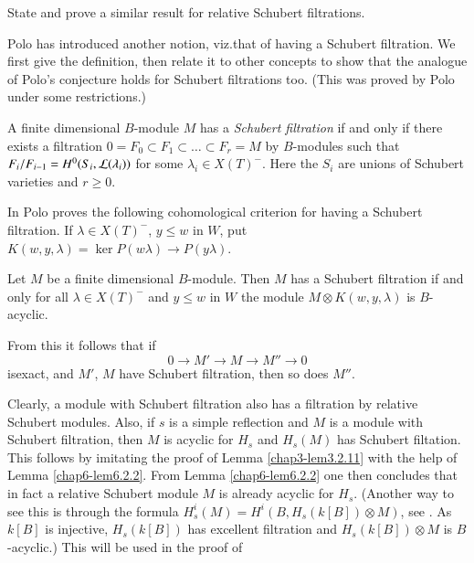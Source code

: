 \begin{exercise}\label{chap6-exer6.3.3}
State and prove a similar result for relative Schubert filtrations.
\end{exercise}

Polo has introduced another notion, viz.\@ that of having a Schubert
filtration. We first give the definition, then relate it to other
concepts to show that the analogue of Polo's conjecture holds for
Schubert filtrations too. (This was proved by Polo under some
restrictions.) 

\begin{definition}\label{chap6-defi6.3.4}
A finite dimensional $B$-module $M$ has a {\em Schubert filtration} if
and only if there exists a filtration $0=F_{0}\subset F_{1}\subset
\ldots \subset F_{r}=M$ by $B$-modules such that
$F_{i}/F_{i-1}=H^{0}(S_{i},\mathcal{L}(\lambda_{i}))$ for some $\lambda_{i}\in
X(T)^{-}$. Here the $S_{i}$ are unions of Schubert varieties and
$r\geq 0$.
\end{definition}

In \cite{key27} Polo proves the following cohomological criterion for
having a Schubert filtration. If $\lambda\in X(T)^{-}$, $y\leq w$ in
$W$, put $K(w,y,\lambda)=\ker P(w\lambda)\to P(y\lambda)$. 

\begin{theorem}[Polo]\label{chap6-thm6.3.5}
Let $M$ be a finite dimensional $B$-module. Then $M$ has a Schubert
filtration if and only for all $\lambda\in X(T)^{-}$ and $y\leq w$ in
$W$ the module $M\otimes K(w,y,\lambda)$ is $B$-acyclic.
\end{theorem}

From this it follows that if
$$
0\to M'\to M\to M''\to 0
$$
is\pageoriginale exact,\label{page66} and $M'$, $M$ have Schubert filtration, then
so does $M''$.

Clearly, a module with Schubert filtration also has a filtration by
relative Schubert modules. Also, if $s$ is a simple reflection and $M$
is a module with Schubert filtration, then $M$ is acyclic for $H_{s}$
and $H_{s}(M)$ has Schubert filtation. This follows by imitating the
proof of Lemma \ref{chap3-lem3.2.11} with the help of Lemma
\ref{chap6-lem6.2.2}. From Lemma \ref{chap6-lem6.2.2} one then
concludes that in fact a relative Schubert module $M$ is already
acyclic for $H_{s}$. (Another way to see this is through the formula
$H^{i}_{s}(M)=H^{i}(B,H_{s}(k[B])\otimes M)$, see \cite[I
  4.10]{key11}. As $k[B]$ is injective, $H_{s}(k[B])$ has excellent
filtration and $H_{s}(k[B])\otimes M$ is $B$-acyclic.) This will be
used in the proof of

